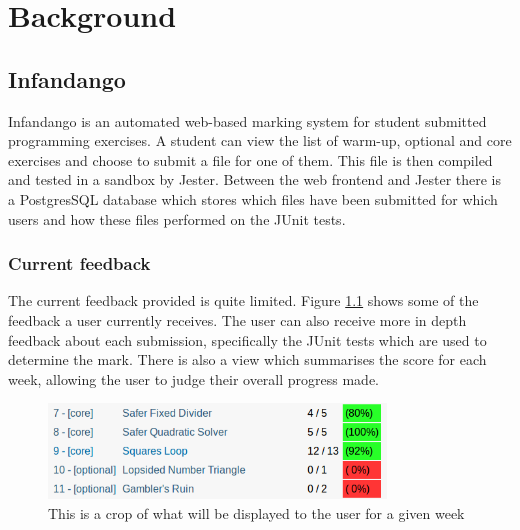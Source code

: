 \chapter{Background}
\label{background}
\section{Infandango}
Infandango is an automated web-based marking system for student submitted programming exercises. A student can view the list of warm-up, optional and core exercises and choose to submit a file for one of them. This file is then compiled and tested in a sandbox by Jester. Between the web frontend and Jester there is a PostgresSQL database which stores which files have been submitted for which users and how these files performed on the JUnit tests.
\subsection{Current feedback}
The current feedback provided is quite limited. Figure \ref{fig:currentfeedback} shows some of the feedback a user currently receives. The user can also receive more in depth feedback about each submission, specifically the JUnit tests which are used to determine the mark. There is also a view which summarises the score for each week, allowing the user to judge their overall progress made.

\begin{figure}[p]
\centering
\includegraphics[width=0.8\textwidth]{currentfeedback.png}
\caption{This is a crop of what will be displayed to the user for a given week}
\label{fig:currentfeedback}
\end{figure}

